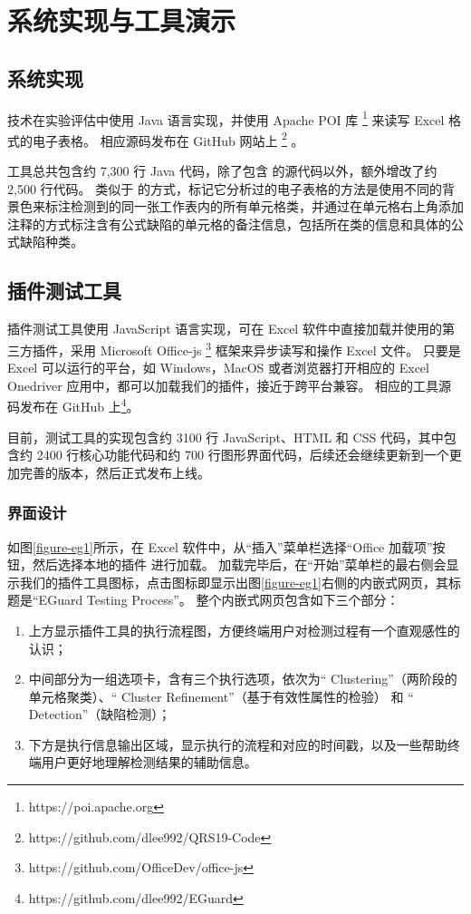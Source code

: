 \chapter{系统实现与工具演示}


\section{\wa 系统实现}
\wa 技术在实验评估中使用 Java 语言实现，并使用 Apache POI 库 \footnote{https://poi.apache.org} 来读写 Excel 格式的电子表格。
相应源码发布在 GitHub 网站上 \footnote{https://github.com/dlee992/QRS19-Code} 。

\wa 工具总共包含约 7,300 行 Java 代码，除了包含 \cu 的源代码以外，额外增改了约 2,500 行代码。
类似于 \cu 的方式，\wa 标记它分析过的电子表格的方法是使用不同的背景色来标注检测到的同一张工作表内的所有单元格类，并通过在单元格右上角添加注释的方式标注含有公式缺陷的单元格的备注信息，包括所在类的信息和具体的公式缺陷种类。


\section{\eg 插件测试工具}
\eg 插件测试工具使用 JavaScript 语言实现，可在 Excel 软件中直接加载并使用的第三方插件，采用 Microsoft Office-js \footnote{https://github.com/OfficeDev/office-js} 框架来异步读写和操作 Excel 文件。
只要是 Excel 可以运行的平台，如 Windows，MacOS 或者浏览器打开相应的 Excel Onedriver 应用中，都可以加载我们的\eg 插件，接近于跨平台兼容。
相应的工具源码发布在 GitHub 上\footnote{https://github.com/dlee992/EGuard}。

目前，\eg 测试工具的实现包含约 3100 行 JavaScript、HTML 和 CSS 代码，其中包含约 2400 行核心功能代码和约 700 行图形界面代码，后续还会继续更新到一个更加完善的版本，然后正式发布上线。






\subsection{界面设计}
如图\ref{figure-eg1}所示，在 Excel 软件中，从“插入”菜单栏选择“Office 加载项”按钮，然后选择本地的插件 \eg 进行加载。
加载完毕后，在“开始”菜单栏的最右侧会显示我们的插件工具图标，点击图标即显示出图\ref{figure-eg1}右侧的内嵌式网页，其标题是“EGuard Testing Process”。
整个内嵌式网页包含如下三个部分：

\begin{enumerate}
    \item 上方显示\eg 插件工具的执行流程图，方便终端用户对检测过程有一个直观感性的认识；
    \item 中间部分为一组选项卡，含有三个执行选项，依次为“ Clustering”（两阶段的单元格聚类）、“ Cluster Refinement”（基于有效性属性的检验） 和 “ Detection”（缺陷检测）；
    \item 下方是执行信息输出区域，显示执行的流程和对应的时间戳，以及一些帮助终端用户更好地理解检测结果的辅助信息。
\end{enumerate}

